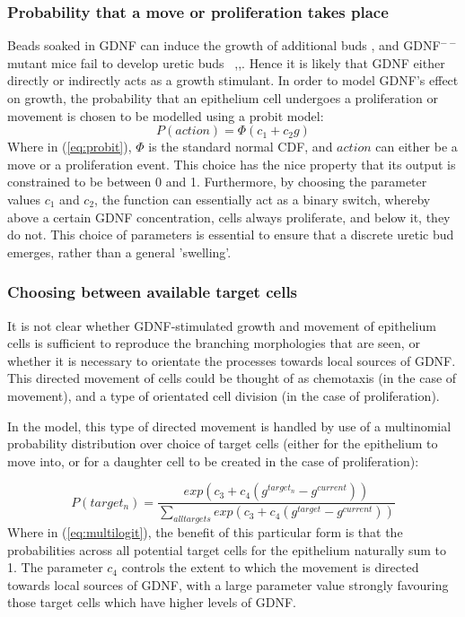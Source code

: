 \documentclass[pdftex,10pt,a4paper,twocolumn]{article}
\begin{document}
\subsubsection{Probability that a move or proliferation takes place}
Beads soaked in GDNF can induce the growth of additional buds \cite{pepicelli1997gdnf}, and GDNF$^{--}$ mutant mice fail to develop uretic buds ~\cite{CostantiniFKopan2010},\cite{majumdar2003wnt11},\cite{treanor1996characterization}. Hence it is likely that GDNF either directly or indirectly acts as a growth stimulant. In order to model GDNF's effect on growth, the probability that an epithelium cell undergoes a proliferation or movement is chosen to be modelled using a probit model:
\begin{equation}\label{eq:probit}
P(action) = \Phi(c_1 + c_2 g)
\end{equation}
Where in (\ref{eq:probit}), $\Phi$ is the standard normal CDF, and $action$ can either be a move or a proliferation event. This choice has the nice property that its output is constrained to be between 0 and 1. Furthermore, by choosing the parameter values $c_1$ and $c_2$, the function can essentially act as a binary switch, whereby above a certain GDNF concentration, cells always proliferate, and below it, they do not. This choice of parameters is essential to ensure that a discrete uretic bud emerges, rather than a general 'swelling'.

\subsubsection{Choosing between available target cells}
It is not clear whether GDNF-stimulated growth and movement of epithelium cells is sufficient to reproduce the branching morphologies that are seen, or whether it is necessary to orientate the processes towards local sources of GDNF. This directed movement of cells could be thought of as chemotaxis (in the case of movement), and a type of orientated cell division (in the case of proliferation).

In the model, this type of directed movement is handled by use of a multinomial probability distribution over choice of target cells (either for the epithelium to move into, or for a daughter cell to be created in the case of proliferation):

\begin{equation} \label{eq:multilogit}
P(target_n) = \frac{exp(c_3 + c_4(g^{target_n} - g^{current}))}{\sum\limits_{all targets} exp(c_3 + c_4(g^{target} - g^{current}))}
\end{equation}
Where in (\ref{eq:multilogit}), the benefit of this particular form is that the probabilities across all potential target cells for the epithelium naturally sum to 1. The parameter $c_4$ controls the extent to which the movement is directed towards local sources of GDNF, with a large parameter value strongly favouring those target cells which have higher levels of GDNF.
\end{document}
